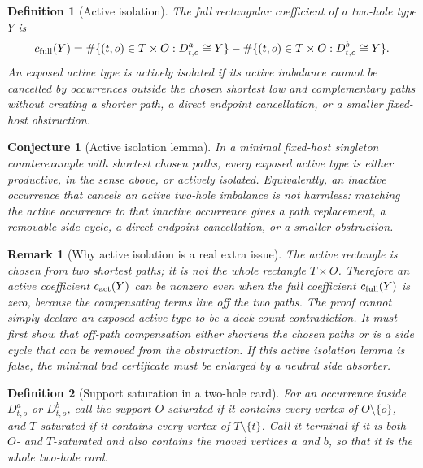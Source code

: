\documentclass[11pt]{article}
\newtheorem{conjecture}{Conjecture}
\newtheorem{definition}{Definition}
\newtheorem{remark}{Remark}
\begin{document}
\begin{definition}[Active isolation]
The full rectangular coefficient of a two-hole type \(Y\) is
\[
  c_{\rm full}(Y)
  =
  \#\{(t,o)\in T\times O:D_{t,o}^a\cong Y\}
  -
  \#\{(t,o)\in T\times O:D_{t,o}^b\cong Y\}.
\]
An exposed active type is actively isolated if its active imbalance cannot be
cancelled by occurrences outside the chosen shortest low and complementary
paths without creating a shorter path, a direct endpoint cancellation, or a
smaller fixed-host obstruction.
\end{definition}

\begin{conjecture}[Active isolation lemma]
In a minimal fixed-host singleton counterexample with shortest chosen paths,
every exposed active type is either productive, in the sense above, or actively
isolated.  Equivalently, an inactive occurrence that cancels an active
two-hole imbalance is not harmless: matching the active occurrence to that
inactive occurrence gives a path replacement, a removable side cycle, a direct
endpoint cancellation, or a smaller obstruction.
\end{conjecture}

\begin{remark}[Why active isolation is a real extra issue]
The active rectangle is chosen from two shortest paths; it is not the whole
rectangle \(T\times O\).  Therefore an active coefficient \(c_{\rm act}(Y)\)
can be nonzero even when the full coefficient \(c_{\rm full}(Y)\) is zero,
because the compensating terms live off the two paths.  The proof cannot
simply declare an exposed active type to be a deck-count contradiction.  It
must first show that off-path compensation either shortens the chosen paths or
is a side cycle that can be removed from the obstruction.  If this active
isolation lemma is false, the minimal bad certificate must be enlarged by a
neutral side absorber.
\end{remark}

\begin{definition}[Support saturation in a two-hole card]
For an occurrence inside \(D_{t,o}^a\) or \(D_{t,o}^b\), call the support
\(O\)-saturated if it contains every vertex of \(O\setminus\{o\}\), and
\(T\)-saturated if it contains every vertex of \(T\setminus\{t\}\).  Call it
terminal if it is both \(O\)- and \(T\)-saturated and also contains the moved
vertices \(a\) and \(b\), so that it is the whole two-hole card.
\end{definition}
\end{document}
